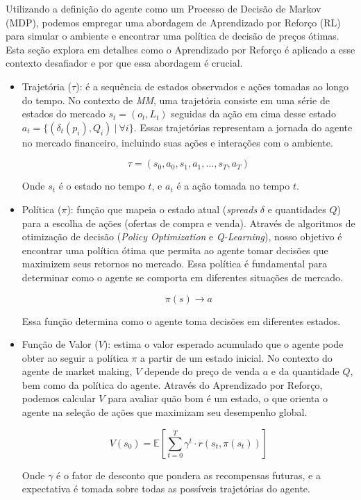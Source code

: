 Utilizando a definição do agente como um Processo de Decisão de Markov (MDP), podemos empregar uma abordagem de Aprendizado por Reforço (RL) para simular o ambiente e encontrar uma política de decisão de preços ótimas. Esta seção explora em detalhes como o Aprendizado por Reforço é aplicado a esse contexto desafiador e por que essa abordagem é crucial.

\begin{itemize}
	\item Trajetória ($\tau$): é a sequência de estados observados e ações tomadas ao longo do tempo. No contexto de \textit{MM}, uma trajetória consiste em uma série de estados do mercado $s_{t} = (o_{t}, L_{t})$ seguidas da ação em cima desse estado $a_{t} = \{(\delta_{t}(p_{i}), Q_{i}) \ | \ \forall i \}$. Essas trajetórias representam a jornada do agente no mercado financeiro, incluindo suas ações e interações com o ambiente.
	
	\[
	\tau = (s_0, a_0, s_1, a_1, \ldots, s_T, a_T)
	\]
	
	Onde \(s_t\) é o estado no tempo \(t\), e \(a_t\) é a ação tomada no tempo \(t\).
	
	\item Política ($\pi$): função que mapeia o estado atual (\textit{spreads} $\delta$ e quantidades $Q$) para a escolha de ações (ofertas de compra e venda). Através de algoritmos de otimização de decisão (\textit{Policy Optimization} e \textit{Q-Learning}), nosso objetivo é encontrar uma política ótima que permita ao agente tomar decisões que maximizem seus retornos no mercado. Essa política é fundamental para determinar como o agente se comporta em diferentes situações de mercado.
	
	\[
	\pi(s) \rightarrow a
	\]
	
	Essa função determina como o agente toma decisões em diferentes estados.
	
	\item Função de Valor ($V$): estima o valor esperado acumulado que o agente pode obter ao seguir a política \(\pi\) a partir de um estado inicial. No contexto do agente de market making, \(V\) depende do preço de venda \(a\) e da quantidade \(Q\), bem como da política do agente. Através do Aprendizado por Reforço, podemos calcular \(V\) para avaliar quão bom é um estado, o que orienta o agente na seleção de ações que maximizam seu desempenho global.
	
	\begin{equation*}
		V(s_0) = \mathbb{E}\left[\sum_{t=0}^{T} \gamma^t \cdot r(s_t, \pi(s_t)) \right]
		\end{equation*}
		
	Onde \(\gamma\) é o fator de desconto que pondera as recompensas futuras, e a expectativa é tomada sobre todas as possíveis trajetórias do agente.
\end{itemize}


